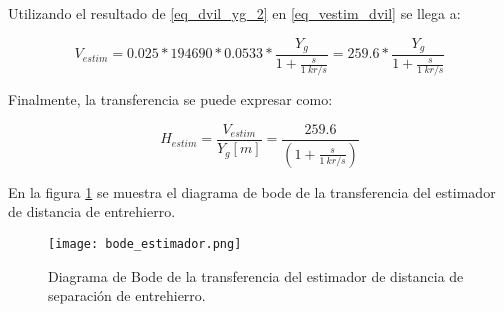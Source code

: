 Utilizando el resultado de \ref{eq_dvil_yg_2} en \ref{eq_vestim_dvil} se llega a:

\begin{equation}
	V_{estim}=0.025*194690*0.0533 * \frac{Y_{g}}{1 + \frac{s}{1\:kr/s}}=259.6*\frac{Y_{g}}{1 + \frac{s}{1\:kr/s}}	
\end{equation}

Finalmente, la transferencia se puede expresar como:

\begin{equation} \label{eq_TLC_deriv_7}
	H_{estim}=\frac{V_{estim}}{Y_{g}[m]}=\frac{259.6}{(1+\frac{s}{1\:kr/s})}
\end{equation}

En la figura \ref{fig:img_bode_estimdaor_final} se muestra el diagrama de bode de la transferencia del estimador de distancia de entrehierro.

\begin{figure}[H]
	\centering
	\texttt{[image: bode\_estimador.png]}
	\caption{Diagrama de Bode de la transferencia del estimador de distancia de separación de entrehierro.}
	\label{fig:img_bode_estimdaor_final}
\end{figure}

